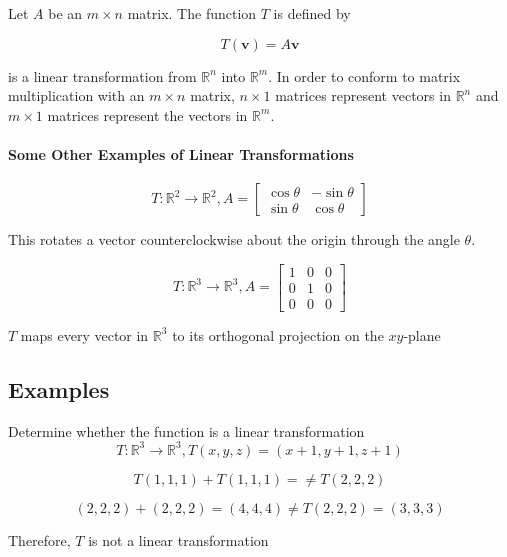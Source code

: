 \documentclass{report}
\begin{document}
\begin{tcolorbox}[title = Linear Transformation Given by a Matrix]
	Let $A$ be an $m \times n$  matrix. The function $T$ is defined by 
	
	$$
	T(\bm{v}) = A \bm{v}
	$$
	
	is a linear transformation from $\mathbb{R}^n$ into $\mathbb{R}^m$. In order to conform to matrix multiplication with an $m \times n$ matrix, $n \times 1$ matrices represent vectors in $\mathbb{R}^n$ and $m \times 1 $ matrices represent the vectors in $\mathbb{R}^m$.
\end{tcolorbox}

\paragraph{Some Other Examples of Linear Transformations}

$$
T: \mathbb{R}^2 \to \mathbb{R}^2, A = \begin{bmatrix} \cos \theta & - \sin \theta \\ \sin \theta & \cos \theta \end{bmatrix}
$$

\noindent This rotates a vector counterclockwise about the origin through the angle $\theta$.

$$
T: \mathbb{R}^3 \to \mathbb{R}^3, A = \begin{bmatrix} 1 & 0 & 0 \\ 0 & 1 & 0 \\ 0 & 0 & 0 \end{bmatrix} 
$$

\noindent $T$ maps every vector in $\mathbb{R}^3$ to its orthogonal projection on the $xy$-plane

\subsection{Examples}

\begin{tcolorbox}[colframe = lightred]
	
	Determine whether the function is a linear transformation
	$$
	T: \mathbb{R}^3 \to \mathbb{R}^3, T(x,y,z) = (x+1, y+1,z+1)
	$$
\end{tcolorbox}

$$
T(1,1,1) + T(1,1,1) = \ne T(2,2,2)
$$

$$
(2,2,2)	 + (2,2,2) = (4,4,4) \ne T(2,2,2) = (3,3,3)
$$

\noindent Therefore, $T$ is not a linear transformation
\end{document}

